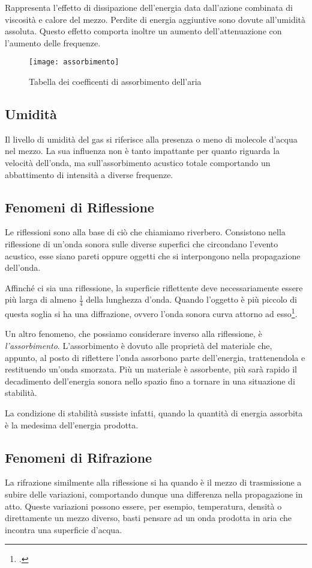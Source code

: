 Rappresenta l’effetto di dissipazione dell’energia data dall’azione combinata
di viscosità e calore del mezzo. Perdite di energia aggiuntive sono dovute
all’umidità assoluta. Questo effetto comporta inoltre un aumento
dell’attenuazione con l’aumento delle frequenze.

\begin{figure}[h]
\centering
\texttt{[image: assorbimento]}
\caption{Tabella dei coefficenti di assorbimento dell'aria}
\label{fig:assorbimento}
\end{figure}

\subsection{Umidità}
Il livello di umidità del gas si riferisce alla presenza o meno di molecole
d’acqua nel mezzo. La sua influenza non è tanto impattante per quanto riguarda
la velocità dell’onda, ma sull’assorbimento acustico totale comportando un
abbattimento di intensità a diverse frequenze.

\subsection{Fenomeni di Riflessione}

Le riflessioni sono alla base di ciò che chiamiamo riverbero. Consistono nella
riflessione di un’onda sonora sulle diverse superfici che circondano l’evento
acustico, esse siano pareti oppure oggetti che si interpongono nella
propagazione dell’onda.

Affinché ci sia una riflessione, la superficie riflettente deve necessariamente
essere più larga di almeno $\frac{1}{4}$ della lunghezza d’onda. Quando
l’oggetto è più piccolo di questa soglia si ha una diffrazione, ovvero l’onda
sonora curva attorno ad esso\footcite{dd:book}.

Un altro fenomeno, che possiamo considerare inverso alla riflessione, è
\emph{l’assorbimento}. L’assorbimento è dovuto alle proprietà del materiale che,
appunto, al posto di riflettere l’onda assorbono parte dell’energia,
trattenendola e restituendo un’onda smorzata. Più un materiale è assorbente,
più sarà rapido il decadimento dell’energia sonora nello spazio fino a tornare
in una situazione di stabilità.

La condizione di stabilità sussiste infatti, quando la quantità di energia
assorbita è la medesima dell’energia prodotta.

\subsection{Fenomeni di Rifrazione}

La rifrazione similmente alla riflessione si ha quando è il mezzo di
trasmissione a subire delle variazioni, comportando dunque una differenza nella
propagazione in atto. Queste variazioni possono essere, per esempio,
temperatura, densità o direttamente un mezzo diverso, basti pensare ad un onda
prodotta in aria che incontra una superficie d’acqua.
